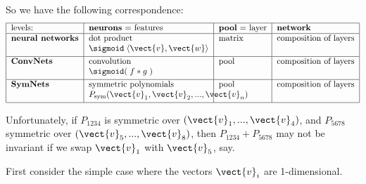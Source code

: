 So we have the following correspondence:
\begin{equation}
\begin{tabular}{|l|l|l|l|}
	\hline
	levels: & \textbf{neurons} = features & \textbf{pool} = layer & \textbf{network} \\
	\hline
	\textbf{neural networks} & \parbox[t]{5cm}{dot product \\ $\sigmoid \; \langle \vect{v}, \vect{w} \rangle$ } & matrix & composition of layers \\[1.5em]
	\hline
	\textbf{ConvNets} & \parbox[t]{5cm}{convolution \\ $\sigmoid( \; f * g \; )$ } & pool & composition of layers \\[1.5em]
	\hline
	\textbf{SymNets} & \parbox[t]{5cm}{symmetric polynomials \\ $P_{\mathrm{sym}} (\vect{v}_1, \vect{v}_2, ..., \vect{v}_n)$ } & pool & composition of layers \\[1.5em]
	\hline
\end{tabular}
\end{equation}

Unfortunately, if $P_{1234}$ is symmetric over $(\vect{v}_1,...,\vect{v}_4)$, and $P_{5678}$ symmetric over $(\vect{v}_5,...,\vect{v}_8)$, then $P_{1234} + P_{5678}$ may not be invariant if we swap $\vect{v}_1$ with $\vect{v}_5$, say.

First consider the simple case where the vectors $\vect{v}_i$ are 1-dimensional.  


